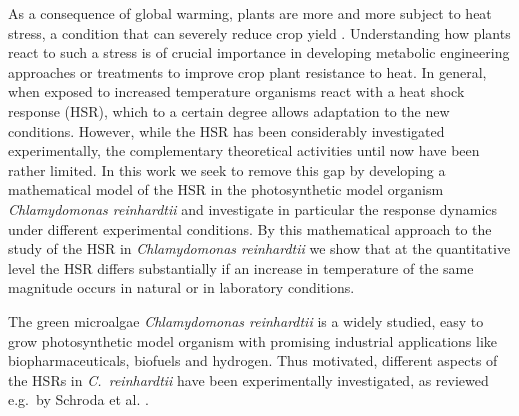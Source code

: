 \documentclass[oneside, 10pt, a4paper, twocolumn]{article}
\begin{document}
As a consequence of global warming, plants are more and more subject to heat stress, a condition that can severely reduce crop yield \cite{Lobell2011,Deryng2014}.
Understanding how plants react to such a stress is of crucial importance in developing metabolic engineering approaches or treatments to improve crop plant resistance to heat. 
In general, when exposed to increased temperature organisms react
with a heat shock response (HSR), which to a certain degree allows adaptation to the new conditions. 
However, while the HSR has been %
considerably investigated experimentally, the complementary theoretical activities %
until now have been rather limited. In this work we seek to remove this gap by developing a mathematical model of the HSR in the photosynthetic model organism \emph{Chlamydomonas reinhardtii} and investigate in particular the response dynamics under different experimental conditions. By this mathematical approach to the study of the HSR in \emph{Chlamydomonas reinhardtii} we show that at the quantitative level the HSR differs substantially if an increase in temperature of the same magnitude occurs in natural or in laboratory conditions.

The green microalgae \emph{Chlamydomonas reinhardtii} %
is a widely studied, easy to grow photosynthetic model organism with promising  industrial applications like biopharmaceuticals, biofuels and hydrogen. 
Thus motivated, different aspects of the HSRs in \emph{C.~reinhardtii} have been experimentally investigated, as reviewed e.g.~by Schroda et al. \cite{Schroda2015}.
\end{document}
